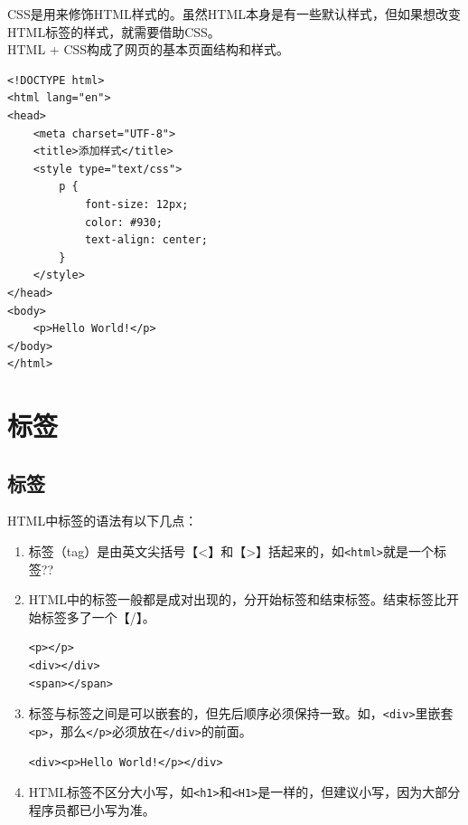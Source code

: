 CSS是用来修饰HTML样式的。虽然HTML本身是有一些默认样式，但如果想改变HTML标签的样式，就需要借助CSS。 \\

HTML + CSS构成了网页的基本页面结构和样式。

\begin{lstlisting}[style=htmlcssjs, title=添加样式]
<!DOCTYPE html>
<html lang="en">
<head>
    <meta charset="UTF-8">
    <title>添加样式</title>
    <style type="text/css">
        p {
            font-size: 12px;
            color: #930;
            text-align: center;
        }
    </style>
</head>
<body>
    <p>Hello World!</p>
</body>
</html>
\end{lstlisting}

\newpage

\section{标签}

\subsection{标签}

HTML中标签的语法有以下几点：

\begin{enumerate}
    \item 标签（tag）是由英文尖括号【<】和【>】括起来的，如\lstinline|<html>|就是一个标签??

    \item HTML中的标签一般都是成对出现的，分开始标签和结束标签。结束标签比开始标签多了一个【/】。 \\
          \begin{lstlisting}[style=htmlcssjs]
<p></p>
<div></div>
<span></span>
    \end{lstlisting}

    \item 标签与标签之间是可以嵌套的，但先后顺序必须保持一致。如，\lstinline|<div>|里嵌套\lstinline|<p>|，那么\lstinline|</p>|必须放在\lstinline|</div>|的前面。 \\
          \begin{lstlisting}[style=htmlcssjs]
<div><p>Hello World!</p></div>
    \end{lstlisting}

    \item HTML标签不区分大小写，如\lstinline|<h1>|和\lstinline|<H1>|是一样的，但建议小写，因为大部分程序员都已小写为准。
\end{enumerate}

